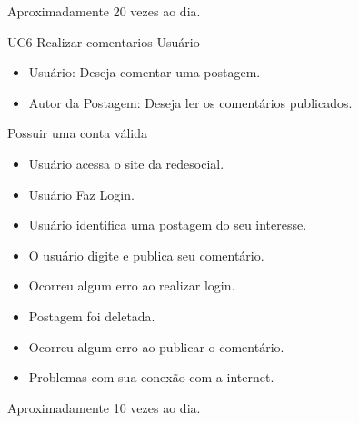 {Aproximadamente 20 vezes ao dia.}
{

}

\casoDeUso
{UC6}
{Realizar comentarios}
{Usuário}
{
\begin{itemize}
	\item Usuário: Deseja comentar uma postagem.
	\item Autor da Postagem: Deseja ler os comentários publicados.
\end{itemize}

}
{Possuir uma conta válida}
{}
{
\begin{itemize}
\item Usuário acessa o site da redesocial.
\item Usuário Faz Login.
\item Usuário identifica uma postagem do seu interesse.
\item O usuário digite e publica seu comentário.
\end{itemize}
}
{
\begin{itemize}
\item Ocorreu algum erro ao realizar login.
\item Postagem foi deletada.
\item Ocorreu algum erro ao publicar o comentário.
\item Problemas com sua conexão com a internet.
\end{itemize}
}
{Aproximadamente 10 vezes ao dia.}
{

}

